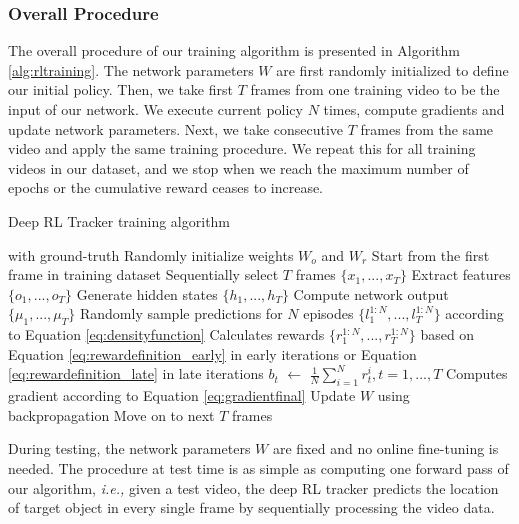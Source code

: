 \documentclass[10pt,twocolumn,letterpaper]{article}
\newcommand*\Let[2]{\State #1 $\gets$ #2}
\begin{document}
	\subsubsection{Overall Procedure}
    
    The overall procedure of our training algorithm is presented in Algorithm \ref{alg:rltraining}. The network parameters $W$ are first randomly initialized to define our initial policy. Then, we take first $T$ frames from one training video to be the input of our network. We execute current policy $N$ times, compute gradients and update network parameters. Next, we take consecutive $T$ frames from the same video and apply the same training procedure. We repeat this for all training videos in our dataset, and we stop when we reach the maximum number of epochs or the cumulative reward ceases to increase.
    
    \begin{algorithm}
      \caption{Deep RL Tracker training algorithm}
        \label{alg:rltraining}
      \begin{algorithmic}[1]
         with ground-truth
        \State Randomly initialize weights $W_o$ and $W_r$
        \State Start from the first frame in training dataset
        \Repeat
            \State Sequentially select $T$ frames $\{x_1,...,x_T\}$
            \State Extract features $\{o_1,...,o_T\}$
            \State Generate hidden states $\{h_1,...,h_T\}$
            \State Compute network output $\{\mu_1,...,\mu_T\}$
            \State Randomly sample predictions for $N$ episodes $\{l_1^{1:N},...,l_T^{1:N}\}$ according to Equation \ref{eq:densityfunction}
            \State Calculates rewards $\{r_1^{1:N},...,r_T^{1:N}\}$ based on Equation \ref{eq:rewardefinition_early} in early iterations or Equation \ref{eq:rewardefinition_late} in late iterations
            \Let{$b_t$}{$\frac{1}{N}\sum_{i=1}^{N}r_t^i, t=1,...,T$}
            \State Computes gradient according to Equation \ref{eq:gradientfinal}
            \State Update $W$ using backpropagation
            \State Move on to next $T$ frames
      \end{algorithmic}
    \end{algorithm}
    
    During testing, the network parameters $W$ are fixed and no online fine-tuning is needed. The procedure at test time is as simple as computing one forward pass of our algorithm, \emph{i.e.,} given a test video, the deep RL tracker predicts the location of target object in every single frame by sequentially processing the video data. 
\end{document}
